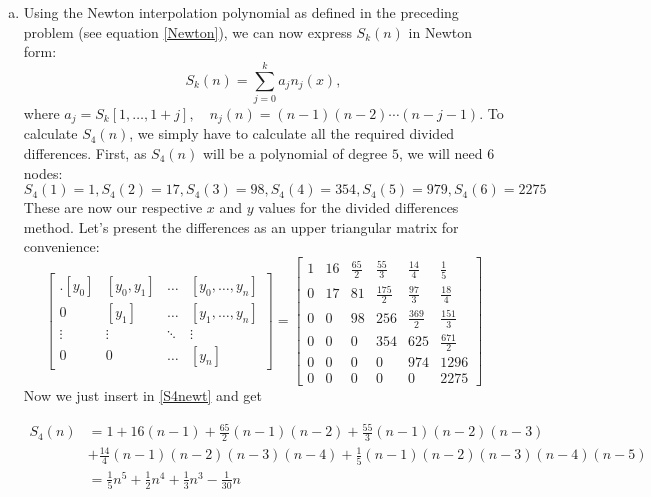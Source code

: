 \begin{enumerate}[a)]
  \item
Using the Newton interpolation polynomial as defined in the preceding problem (see equation  \ref{Newton}), we can now express $S_k(n)$ in Newton form:
  \begin{equation}\label{S4newt} S_k(n) = \sum_{j=0}^k a_jn_j(x), \end{equation}
where $a_j = S_k[1,\dots, 1+j], \quad n_j(n) = (n-1)(n-2)\cdots(n-j-1)$. To calculate $S_4(n)$, we simply have to calculate all the required divided differences. First, as $S_4(n)$ will be a polynomial of degree $5$, we will need $6$ nodes:
  $$ S_4(1) = 1, S_4(2)=17, S_4(3)=98, S_4(4)=354,S_4(5)=979, S_4(6)=2275 $$
These are now our respective $x$ and $y$ values for the divided differences method. Let's present the differences as an upper triangular matrix for convenience:
$$
\begin{bmatrix}
. [ y_0 ] & [ y_0, y_1 ] & \dots & [y_0, \dots , y_n ] \\
  0 & [ y_1 ] & \dots & [y_1, \dots, y_n ] \\
  \vdots & \vdots & \ddots & \vdots \\
  0 & 0 & \dots & [ y_n ]
\end{bmatrix}
=
\begin{bmatrix}
1 & 16 & \frac{65}{2} & \frac{55}{3} & \frac{14}{4} & \frac{1}{5} \\
0 & 17 & 81 & \frac{175}{2} & \frac{97}{3} & \frac{18}{4} \\
0 & 0 & 98 & 256 & \frac{369}{2} & \frac{151}{3} \\
0 & 0 & 0 & 354 & 625 & \frac{671}{2} \\
0 & 0 & 0 & 0 & 974 & 1296 \\
0 & 0 & 0 & 0 & 0 & 2275
\end{bmatrix}$$
Now we just insert in \ref{S4newt} and get

\begin{align*}
  S_4(n) & =1+16(n-1)+\frac{65}{2}(n-1)(n-2)+\frac{55}{3}(n-1)(n-2)(n-3) \\
         & +\frac{14}{4}(n-1)(n-2)(n-3)(n-4)+\frac{1}{5}(n-1)(n-2)(n-3)(n-4)(n-5) \\
         & = \frac{1}{5}n^5+\frac{1}{2}n^4+\frac{1}{3}n^3-\frac{1}{30}n
\end{align*}

\end{enumerate}


